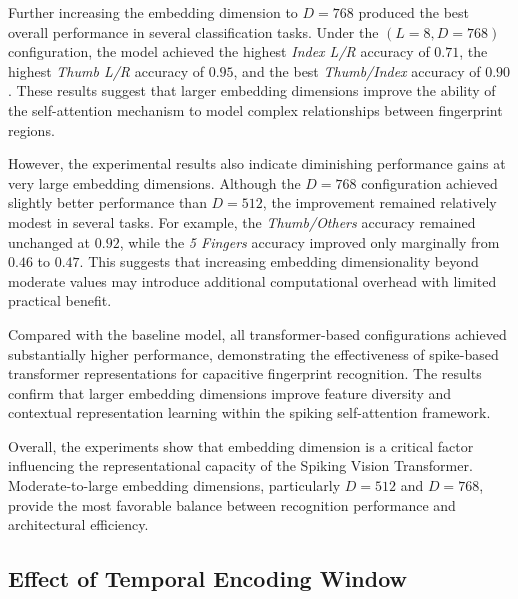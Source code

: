 \documentclass[../main.tex]{subfiles}
\begin{document}
Further increasing the embedding dimension to \(D=768\) produced the best overall performance in several classification tasks. Under the \((L=8, D=768)\) configuration, the model achieved the highest \textit{Index L/R} accuracy of \(0.71\), the highest \textit{Thumb L/R} accuracy of \(0.95\), and the best \textit{Thumb/Index} accuracy of \(0.90\). These results suggest that larger embedding dimensions improve the ability of the self-attention mechanism to model complex relationships between fingerprint regions.

However, the experimental results also indicate diminishing performance gains at very large embedding dimensions. Although the \(D=768\) configuration achieved slightly better performance than \(D=512\), the improvement remained relatively modest in several tasks. For example, the \textit{Thumb/Others} accuracy remained unchanged at \(0.92\), while the \textit{5 Fingers} accuracy improved only marginally from \(0.46\) to \(0.47\). This suggests that increasing embedding dimensionality beyond moderate values may introduce additional computational overhead with limited practical benefit.

Compared with the baseline model, all transformer-based configurations achieved substantially higher performance, demonstrating the effectiveness of spike-based transformer representations for capacitive fingerprint recognition. The results confirm that larger embedding dimensions improve feature diversity and contextual representation learning within the spiking self-attention framework.

Overall, the experiments show that embedding dimension is a critical factor influencing the representational capacity of the Spiking Vision Transformer. Moderate-to-large embedding dimensions, particularly \(D=512\) and \(D=768\), provide the most favorable balance between recognition performance and architectural efficiency.

\subsection{Effect of Temporal Encoding Window}

\begin{table}[t]
\centering
\caption{Performance of the Spiking Vision Transformer under Different Temporal Encoding Windows.}
\label{tab:spikeformer-timestep-results}
\end{table}
\end{document}
